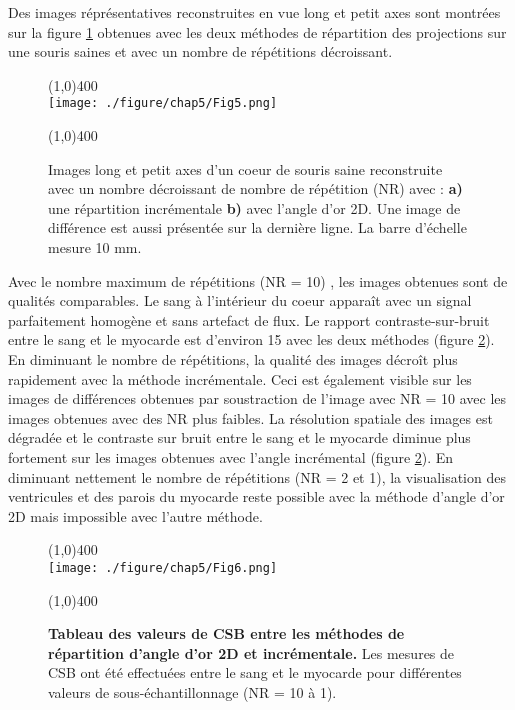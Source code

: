 Des images réprésentatives reconstruites en vue long et petit axes sont montrées sur la figure \ref{fig:ImGoldVSIncNr} obtenues avec les deux méthodes de répartition des projections sur une souris saines et avec un nombre de répétitions décroissant.

\begin{figure}[H]
\centering
\line(1,0){400} \\
\texttt{[image: ./figure/chap5/Fig5.png]}
\caption[Image de l'nfluence de la trajectoire en fonction du sous-échantillonnage]{\label{fig:ImGoldVSIncNr} Images long et petit axes d'un coeur de souris saine reconstruite avec un nombre décroissant de nombre de répétition (NR) avec : \textbf{a)} une répartition incrémentale \textbf{b)} avec l'angle d'or 2D. Une image de différence est aussi présentée sur la dernière ligne. La barre d'échelle mesure 10 mm.}
\line(1,0){400} \\ 
\end{figure}

Avec le nombre maximum de répétitions (NR = 10) , les images obtenues sont de qualités comparables. Le sang à l'intérieur du coeur apparaît avec un signal parfaitement homogène et sans artefact de flux. Le rapport contraste-sur-bruit entre le sang et le myocarde est d'environ 15 avec les deux méthodes (figure \ref{fig:TabGoldVSIncNr}). En diminuant le nombre de répétitions, la qualité des images décroît plus rapidement avec la méthode incrémentale. Ceci est également visible sur les images de différences obtenues par soustraction de l'image avec NR = 10 avec les images obtenues avec des NR plus faibles.
La résolution spatiale des images est dégradée et le contraste sur bruit entre le sang et le myocarde diminue plus fortement sur les images obtenues avec l’angle incrémental (figure \ref{fig:TabGoldVSIncNr}). En diminuant nettement le nombre de répétitions (NR = 2 et 1), la visualisation des ventricules et des parois du myocarde reste possible avec la méthode d'angle d’or 2D mais impossible avec l’autre méthode.

\begin{figure}[H]
\centering
\line(1,0){400} \\
\texttt{[image: ./figure/chap5/Fig6.png]}
\caption[Tableau des valeurs de CSB entre les méthodes de répartition d'angle d'or 2D et incrémentale.]{\label{fig:TabGoldVSIncNr} \textbf{Tableau des valeurs de CSB entre les méthodes de répartition d'angle d'or 2D et incrémentale.} Les mesures de CSB ont été effectuées entre le sang et le myocarde pour différentes valeurs de sous-échantillonnage (NR = 10 à 1).}
\line(1,0){400} \\ 
\end{figure}


